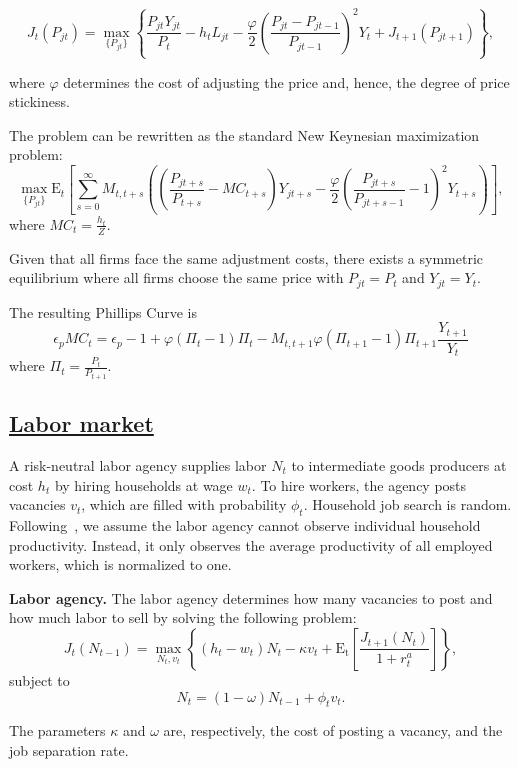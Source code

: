 \documentclass[\latexroot/\projectname]{subfiles}
\begin{document}
\[
  J_{t}\left(P_{jt}\right) = \max_{\{P_{jt}\}} \left\{\frac{P_{jt}Y_{jt}}{P_{t}} - h_{t} L_{jt} -  \frac{\varphi}{2}{\left( \frac{P_{jt} - P_{jt-1}}{P_{jt-1}} \right)}^{2} Y_{t}  + J_{t+1}\left(P_{jt+1}\right) \right\},
\]

where $\varphi$ determines the cost of adjusting the price and, hence, the degree of price stickiness.

The problem can be rewritten as the standard New Keynesian maximization problem:
\[
  \max_{\{P_{jt}\}} \mathrm{E}_{t}\left[\sum_{s=0}^{\infty}  M_{t,t+s} \left( \left( \frac{P_{jt+s}}{P_{t+s}} - MC_{t+s}\right)Y_{jt+s} -  \frac{\varphi}{2}{\left( \frac{P_{jt+s}}{P_{jt+s-1}} - 1\right)}^{2} Y_{t+s} \right)\right],
\]
where $MC_{t} = \frac{h_{t}}{Z}$.

Given that all firms face the same adjustment costs, there exists a symmetric equilibrium where all firms choose the same price with $P_{jt}=P_{t}$ and $Y_{jt}=Y_{t}$.

The resulting Phillips Curve is
\[
  \epsilon_{p} MC_{t} = \epsilon_{p} - 1 + \varphi ( \Pi_{t} -1) \Pi_{t} - M_{t,t+1} \varphi (\Pi_{t+1} -1 ) \Pi_{t+1} \frac{Y_{t+1}}{Y_{t}}
\]
where $\Pi_{t} = \frac{P_{t}}{P_{t+1}}$.

\subsection{\href{\WebBase\#sec:hank-labor-market}{Labor market}}\whenintegrated{\label{sec:hank-labor-market}}

A risk-neutral labor agency supplies labor \( N_t \) to intermediate goods producers at cost \( h_t \) by hiring households at wage \( w_t \). To hire workers, the agency posts vacancies \( v_t \), which are filled with probability \( \phi_t \). Household job search is random. Following~\cite{Bardoczy2021}, we assume the labor agency cannot observe individual household productivity. Instead, it only observes the average productivity of all employed workers, which is normalized to one.

\textbf{Labor agency.} The labor agency determines how many vacancies to post and how much labor to sell by solving the following problem:
\[
  J_{t}(N_{t-1})  = \max_{N_{t},v_{t}} \left\{( h_{t} - w_{t}) N_{t}- \kappa v_{t} + \mathrm{E_{t}}\left[ \frac{J_{t+1}(N_{t})}{1 + r^{a}_{t}}\right]\right\},
\]
subject to
\[
  N_{t} = (1-\omega)N_{t-1} + \phi_{t} v_{t}.
\]

The parameters $\kappa$ and $\omega$ are, respectively, the cost of posting a vacancy, and the job separation rate.
\end{document}
